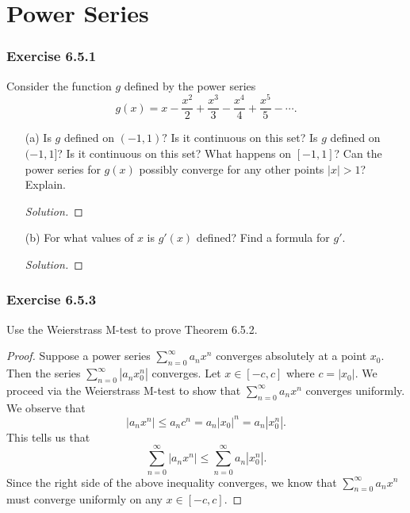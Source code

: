 \section{Power Series}

\subsubsection{Exercise 6.5.1} Consider the function \( g  \) defined by the power series 
\[  g(x) = x - \frac{ x^2  }{ 2  }  + \frac{ x^3  }{  3  }  - \frac{ x^4  }{ 4  }  + \frac{ x^5  }{  5  }  - \dotsb . \]
\begin{enumerate}
    \item[(a)] Is \( g  \) defined on \( (-1,1)?  \) Is it continuous on this set? Is \( g  \) defined on \( (-1,1]  \)? Is it continuous on this set? What happens on \( [-1,1]  \)? Can the power series for \( g(x) \) possibly converge for any other points \( | x  | > 1  \)? Explain.
        \begin{proof}[Solution]
        
        \end{proof}
    \item[(b)] For what values of \( x \) is \( g'(x)  \) defined? Find a formula for \( g' \).
        \begin{proof}[Solution]
        
        \end{proof}
\end{enumerate}

\subsubsection{Exercise 6.5.3} Use the Weierstrass M-test to prove Theorem 6.5.2.
\begin{proof}
    Suppose a power series \( \sum_{ n=0  }^{  \infty   } a_n x^n  \) converges absolutely at a point \( x_0  \). Then the series \(  \sum_{ n=0  }^{  \infty  } | a_n x_0^n |  \) converges. Let \( x \in [-c , c ] \) where \( c = | x_0  |  \). We proceed via the Weierstrass M-test to show that \( \sum_{ n=0  }^{ \infty  } a_n x^n  \) converges uniformly. We observe that 
    \[  | a_n x^n  |  \leq a_n c^n = a_n | x_0  |^n = a_n | x_0^n | .  \]
    This tells us that 
    \[  \sum_{ n=0 }^{  \infty   } | a_n x^n | \leq \sum_{ n=0  }^{ \infty  } a_n | x_0^n  |.   \]
    Since the right side of the above inequality converges, we know that \( \sum_{ n=0  }^{ \infty  } a_n x^n  \) must converge uniformly on any \( x \in [-c ,c ]  \).
\end{proof}



